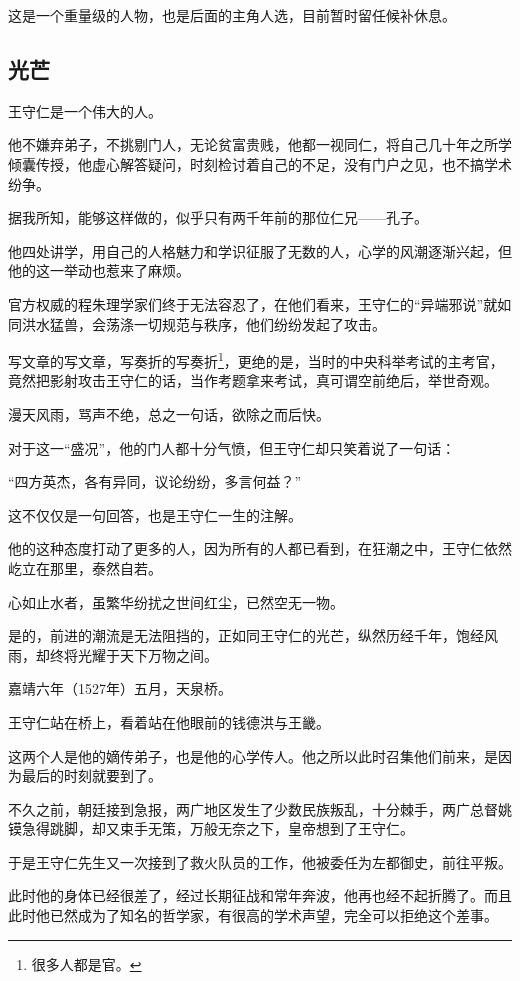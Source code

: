 \begin{multicols}{\theparacolNo}
		这是一个重量级的人物，也是后面的主角人选，目前暂时留任候补休息。

		\subsection{光芒}
		王守仁是一个伟大的人。

		他不嫌弃弟子，不挑剔门人，无论贫富贵贱，他都一视同仁，将自己几十年之所学倾囊传授，他虚心解答疑问，时刻检讨着自己的不足，没有门户之见，也不搞学术纷争。

		据我所知，能够这样做的，似乎只有两千年前的那位仁兄——孔子。

		他四处讲学，用自己的人格魅力和学识征服了无数的人，心学的风潮逐渐兴起，但他的这一举动也惹来了麻烦。

		官方权威的程朱理学家们终于无法容忍了，在他们看来，王守仁的“异端邪说”就如同洪水猛兽，会荡涤一切规范与秩序，他们纷纷发起了攻击。

		写文章的写文章，写奏折的写奏折\footnote{很多人都是官。}，更绝的是，当时的中央科举考试的主考官，竟然把影射攻击王守仁的话，当作考题拿来考试，真可谓空前绝后，举世奇观。

		漫天风雨，骂声不绝，总之一句话，欲除之而后快。

		对于这一“盛况”，他的门人都十分气愤，但王守仁却只笑着说了一句话：

		“四方英杰，各有异同，议论纷纷，多言何益？”

		这不仅仅是一句回答，也是王守仁一生的注解。

		他的这种态度打动了更多的人，因为所有的人都已看到，在狂潮之中，王守仁依然屹立在那里，泰然自若。

		心如止水者，虽繁华纷扰之世间红尘，已然空无一物。

		是的，前进的潮流是无法阻挡的，正如同王守仁的光芒，纵然历经千年，饱经风雨，却终将光耀于天下万物之间。

		嘉靖六年（1527年）五月，天泉桥。

		王守仁站在桥上，看着站在他眼前的钱德洪与王畿。

		这两个人是他的嫡传弟子，也是他的心学传人。他之所以此时召集他们前来，是因为最后的时刻就要到了。

		不久之前，朝廷接到急报，两广地区发生了少数民族叛乱，十分棘手，两广总督姚镆急得跳脚，却又束手无策，万般无奈之下，皇帝想到了王守仁。

		于是王守仁先生又一次接到了救火队员的工作，他被委任为左都御史，前往平叛。

		此时他的身体已经很差了，经过长期征战和常年奔波，他再也经不起折腾了。而且此时他已然成为了知名的哲学家，有很高的学术声望，完全可以拒绝这个差事。


\end{multicols}
